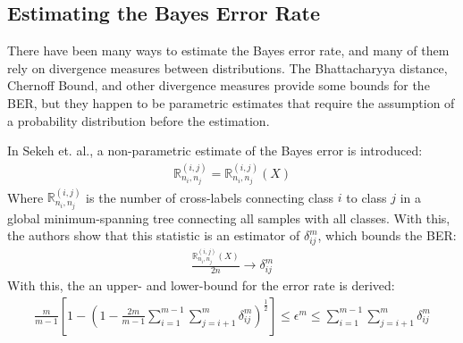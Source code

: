 \documentclass[paper=a4, fontsize=12pt]{scrartcl} %
\numberwithin{equation}{section} %
\numberwithin{figure}{section} %
\numberwithin{table}{section} %
\begin{document}
\subsection{Estimating the Bayes Error Rate} %

There have been many ways to estimate the Bayes error rate, and many of them rely on divergence measures between distributions. 
The Bhattacharyya distance, Chernoff Bound, and other divergence measures provide some bounds for the BER, but they happen to be 
parametric estimates that require the assumption of a probability distribution before the estimation.

In Sekeh et. al.\cite{ber}, a non-parametric estimate of the Bayes error is introduced:
\begin{align*}
    \mathbb{R}_{n_i,n_j}^{(i,j)} = \mathbb{R}_{n_i,n_j}^{(i,j)}(X)
\end{align*}
Where $\mathbb{R}_{n_i,n_j}^{(i,j)}$ is the number of cross-labels connecting class $i$ to class $j$ in a global minimum-spanning tree 
connecting all samples with all classes. With this, the authors show that this statistic is an estimator of $\delta_{ij}^m$, which bounds the 
BER:
\begin{align*}
    \frac{\mathbb{R}_{n_i,n_j}^{(i,j)}(X)}{2n} \rightarrow \delta_{ij}^m
\end{align*}
With this, the an upper- and lower-bound for the error rate is derived:
\begin{align*}
    \frac{m}{m-1} \left[ 1 - \left(1 - \frac{2m}{m-1} \sum_{i=1}^{m-1} \sum_{j=i+1}^m \delta_{ij}^m \right)^{\frac{1}{2}} \right] \leq \epsilon^m \leq \sum_{i=1}^{m-1} \sum_{j=i+1}^m \delta_{ij}^m
\end{align*}

\pagebreak

\end{document}
